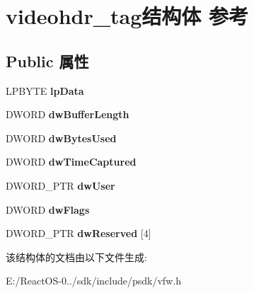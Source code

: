 \hypertarget{structvideohdr__tag}{}\section{videohdr\+\_\+tag结构体 参考}
\label{structvideohdr__tag}
\subsection*{Public 属性}
\begin{DoxyCompactItemize}
\item 
\mbox{\label{structvideohdr__tag_ae57f81947083405807d0d66c00353121}} 
L\+P\+B\+Y\+TE {\bfseries lp\+Data}
\item 
\mbox{\label{structvideohdr__tag_a24c685e057ddd5e8510a7357843491ca}} 
D\+W\+O\+RD {\bfseries dw\+Buffer\+Length}
\item 
\mbox{\label{structvideohdr__tag_ae74b07398db3f31cfd85578d611efda1}} 
D\+W\+O\+RD {\bfseries dw\+Bytes\+Used}
\item 
\mbox{\label{structvideohdr__tag_a1d94462018ea9ea543f32bd4e783558a}} 
D\+W\+O\+RD {\bfseries dw\+Time\+Captured}
\item 
\mbox{\label{structvideohdr__tag_ac8756d18b24c75f628cf624c522cdf09}} 
D\+W\+O\+R\+D\+\_\+\+P\+TR {\bfseries dw\+User}
\item 
\mbox{\label{structvideohdr__tag_a2e0af7ed7bf598a3525757f32c1a4ea1}} 
D\+W\+O\+RD {\bfseries dw\+Flags}
\item 
\mbox{\label{structvideohdr__tag_a610ce87e0db46883227b90456662deca}} 
D\+W\+O\+R\+D\+\_\+\+P\+TR {\bfseries dw\+Reserved} \mbox{[}4\mbox{]}
\end{DoxyCompactItemize}


该结构体的文档由以下文件生成\+:\begin{DoxyCompactItemize}
\item 
E\+:/\+React\+O\+S-\/0../sdk/include/psdk/vfw.\+h\end{DoxyCompactItemize}
